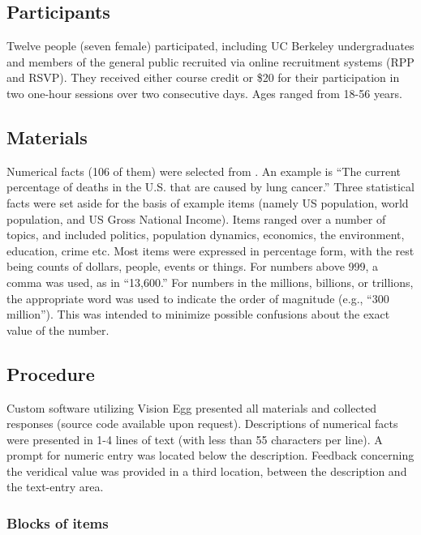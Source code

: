 \subsection{Participants}

Twelve people (seven female) participated, including UC Berkeley undergraduates
and members of the general public recruited via online recruitment systems (RPP
and RSVP). They received either course credit or \$20 for their participation in
two one-hour sessions over two consecutive days. Ages ranged from 18-56 years. 

\subsection{Materials}

Numerical facts (106 of them) were selected from \textcite{ranney_designing_2008}.
An example is ``The current percentage of deaths in the U.S. that are
caused by lung cancer.'' Three statistical facts were set aside for the basis of
example items (namely US population, world population, and US Gross National
Income). Items ranged over a number of topics, and included politics, population
dynamics, economics, the environment, education, crime etc. Most items were
expressed in percentage form, with the rest being counts of dollars, people,
events or things. For numbers above 999, a comma was used, as in ``13,600.''  For
numbers in the millions, billions, or trillions, the appropriate word was used
to indicate the order of magnitude (e.g., ``300 million'').  This was intended to
minimize possible confusions about the exact value of the number.

\subsection{Procedure}

Custom software utilizing Vision Egg \parencite{straw_vision_2008} presented all materials and
collected responses (source code available upon request). Descriptions of
numerical facts were presented in 1-4 lines of text (with less than 55
characters per line). A prompt for numeric entry was located below the
description. Feedback concerning the veridical value was provided in a third
location, between the description and the text-entry area.

\subsubsection{Blocks of items}

